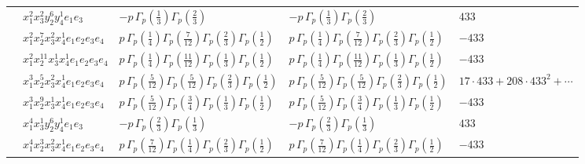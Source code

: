 \documentclass[11pt]{article}
\begin{document}
\begin{table}[ht]
{\begin{tabular}{@{}lllll@{}}
 & $x_{1}^{2} x_{3}^{2} y_{2}^{6} y_{4}^{1} e_{1} e_{3}$ & $- p \, \Gamma_p \left( \frac{1}{3} \right) \Gamma_p \left( \frac{2}{3} \right)$ & $- p \, \Gamma_p \left( \frac{1}{3} \right) \Gamma_p \left( \frac{2}{3} \right)$ & $433$ \\
 & $x_{1}^{2} x_{2}^{7} x_{3}^{2} x_{4}^{1}  e_{1} e_{2} e_{3} e_{4}$ & $p \, \Gamma_p \left( \frac{1}{4} \right) \Gamma_p \left( \frac{7}{12} \right) \Gamma_p \left( \frac{2}{3} \right) \Gamma_p \left( \frac{1}{2} \right)$ & $p \, \Gamma_p \left( \frac{1}{4} \right) \Gamma_p \left( \frac{7}{12} \right) \Gamma_p \left( \frac{2}{3} \right) \Gamma_p \left( \frac{1}{2} \right)$ & $-433$ \\
 & $x_{1}^{2} x_{2}^{11} x_{3}^{1} x_{4}^{1}  e_{1} e_{2} e_{3} e_{4}$ & $p \, \Gamma_p \left( \frac{1}{4} \right) \Gamma_p \left( \frac{11}{12} \right) \Gamma_p \left( \frac{1}{3} \right) \Gamma_p \left( \frac{1}{2} \right)$ & $p \, \Gamma_p \left( \frac{1}{4} \right) \Gamma_p \left( \frac{11}{12} \right) \Gamma_p \left( \frac{1}{3} \right) \Gamma_p \left( \frac{1}{2} \right)$ & $-433$ \\
 & $x_{1}^{3} x_{2}^{5} x_{3}^{2} x_{4}^{1}  e_{1} e_{2} e_{3} e_{4}$ & $p \, \Gamma_p \left( \frac{5}{12} \right) \Gamma_p \left( \frac{5}{12} \right) \Gamma_p \left( \frac{2}{3} \right) \Gamma_p \left( \frac{1}{2} \right)$ & $p \, \Gamma_p \left( \frac{5}{12} \right) \Gamma_p \left( \frac{5}{12} \right) \Gamma_p \left( \frac{2}{3} \right) \Gamma_p \left( \frac{1}{2} \right)$ & $17{\cdot}433{+}208{\cdot}433^{2}{+}\cdots$ \\
 & $x_{1}^{3} x_{2}^{9} x_{3}^{1} x_{4}^{1}  e_{1} e_{2} e_{3} e_{4}$ & $p \, \Gamma_p \left( \frac{5}{12} \right) \Gamma_p \left( \frac{3}{4} \right) \Gamma_p \left( \frac{1}{3} \right) \Gamma_p \left( \frac{1}{2} \right)$ & $p \, \Gamma_p \left( \frac{5}{12} \right) \Gamma_p \left( \frac{3}{4} \right) \Gamma_p \left( \frac{1}{3} \right) \Gamma_p \left( \frac{1}{2} \right)$ & $-433$ \\
 & $x_{1}^{4} x_{3}^{1} y_{2}^{6} y_{4}^{1} e_{1} e_{3}$ & $- p \, \Gamma_p \left( \frac{2}{3} \right) \Gamma_p \left( \frac{1}{3} \right)$ & $- p \, \Gamma_p \left( \frac{2}{3} \right) \Gamma_p \left( \frac{1}{3} \right)$ & $433$ \\
 & $x_{1}^{4} x_{2}^{3} x_{3}^{2} x_{4}^{1}  e_{1} e_{2} e_{3} e_{4}$ & $p \, \Gamma_p \left( \frac{7}{12} \right) \Gamma_p \left( \frac{1}{4} \right) \Gamma_p \left( \frac{2}{3} \right) \Gamma_p \left( \frac{1}{2} \right)$ & $p \, \Gamma_p \left( \frac{7}{12} \right) \Gamma_p \left( \frac{1}{4} \right) \Gamma_p \left( \frac{2}{3} \right) \Gamma_p \left( \frac{1}{2} \right)$ & $-433$ \\

\end{tabular}}
\end{table}
\end{document}
